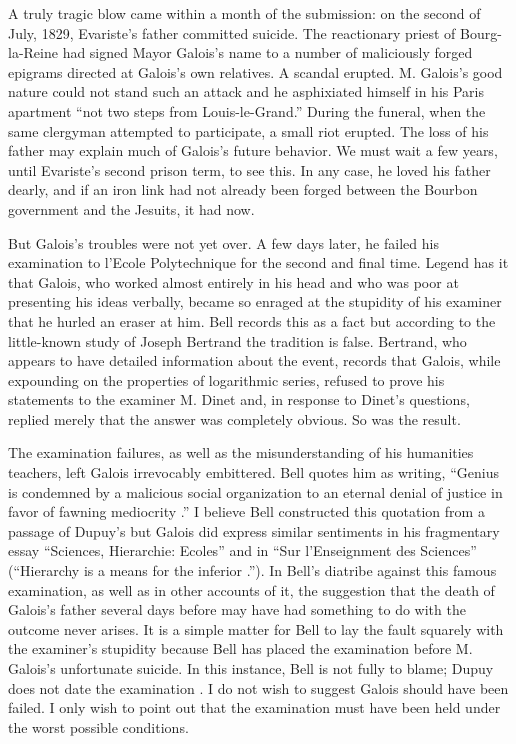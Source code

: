 \documentclass[12pt]{article}
\begin{document}
A truly tragic blow came within a month of the submission: on the second of July, 1829, Evariste's father committed suicide. The reactionary priest of Bourg-la-Reine had signed Mayor Galois's name to a number of maliciously forged epigrams directed at Galois's own relatives. A scandal erupted. M. Galois's good nature could not stand such an attack and he asphixiated himself in his Paris apartment ``not two steps from Louis-le-Grand.'' During the funeral, when the same clergyman attempted to participate, a small riot erupted. The loss of his father may explain much of Galois's future behavior. We must wait a few years, until Evariste's second prison term, to see this. In any case, he loved his father dearly, and if an iron link had not already been forged between the Bourbon government and the Jesuits, it had now.

But Galois's troubles were not yet over. A few days later, he failed his examination to l'Ecole Polytechnique for the second and final time. Legend has it that Galois, who worked almost entirely in his head and who was poor at presenting his ideas verbally, became so enraged at the stupidity of his examiner that he hurled an eraser at him. Bell records this as a fact \cite{25} but according to the little-known study of Joseph Bertrand \cite{26} the tradition is false. Bertrand, who appears to have detailed information about the event, records that Galois, while expounding on the properties of logarithmic series, refused to prove his statements to the examiner M. Dinet and, in response to Dinet's questions, replied merely that the answer was completely obvious. So was the result.

The examination failures, as well as the misunderstanding of his humanities teachers, left Galois irrevocably embittered. Bell quotes him as writing, ``Genius is condemned by a malicious social organization to an eternal denial of justice in favor of fawning mediocrity \cite{27}.'' I believe Bell constructed this quotation from a passage of Dupuy's \cite{28} but Galois did express similar sentiments in his fragmentary essay ``Sciences, Hierarchie: Ecoles'' and in ``Sur l'Enseignment des Sciences'' (``Hierarchy is a means for the inferior \cite{29}.''). In Bell's diatribe against this famous examination, as well as in other accounts of it, the suggestion that the death of Galois's father several days before may have had something to do with the outcome never arises. It is a simple matter for Bell to lay the fault squarely with the examiner's stupidity because Bell has placed the examination before M. Galois's unfortunate suicide. In this instance, Bell is not fully to blame; Dupuy does not date the examination \cite{30}. I do not wish to suggest Galois should have been failed. I only wish to point out that the examination must have been held under the worst possible conditions.
\end{document}

